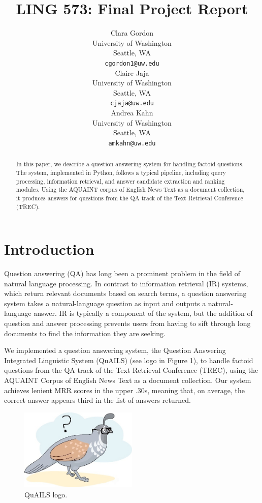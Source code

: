 \documentclass[11pt]{article}
\title{LING 573: Final Project Report}
\author{Clara Gordon \\
  University of Washington \\
  Seattle, WA \\
  {\tt cgordon1@uw.edu} \\\And
  Claire Jaja \\
  University of Washington \\
  Seattle, WA \\
  {\tt cjaja@uw.edu} \\\And
  Andrea Kahn \\
  University of Washington \\
  Seattle, WA \\
  {\tt amkahn@uw.edu} \\}
\date{}
\begin{document}
\maketitle
\begin{abstract}

In this paper, we describe a question answering system for handling factoid questions.  The system, implemented in Python, follows a typical pipeline, including query processing, information retrieval, and answer candidate extraction and ranking modules. Using the AQUAINT corpus of English News Text as a document collection, it produces answers for questions from the QA track of the Text Retrieval Conference (TREC).

\end{abstract}

\section{Introduction}

Question answering (QA) has long been a prominent problem in the field of natural language processing. In contrast to information retrieval (IR) systems, which return relevant documents based on search terms, a question answering system takes a natural-language question as input and outputs a natural-language answer. IR is typically a component of the system, but the addition of question and answer processing prevents users from having to sift through long documents to find the information they are seeking.

We implemented a question answering system, the Question Answering Integrated Linguistic System (QuAILS) (see logo in Figure 1), to handle factoid questions from the QA track of the Text Retrieval Conference (TREC), using the AQUAINT Corpus of English News Text as a document collection.  Our system achieves lenient MRR scores in the upper .30s, meaning that, on average, the correct answer appears third in the list of answers returned.

\begin{figure}
\centering
\includegraphics[width=0.5\textwidth]{QuAILS.jpg}
\caption{QuAILS logo.}
\end{figure}
\end{document}
